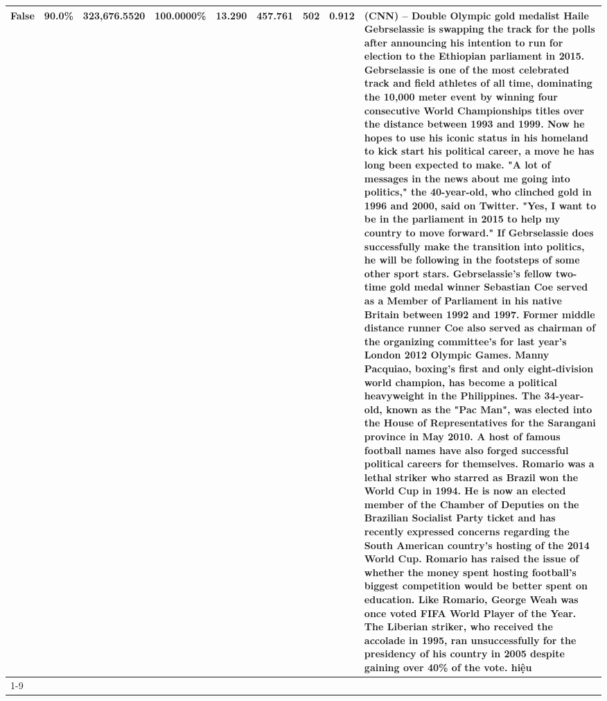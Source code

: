 \begin{table}[H]
{\begin{tabular}{lllrlllll}
False & 90.0\% & 323,676.5520 & \bfseries \color{red} 100.0000\% & 13.290 & 457.761 & 502 & 0.912 & (CNN) -- Double Olympic gold medalist Haile Gebrselassie is swapping the track for the polls after announcing his intention to run for election to the Ethiopian parliament in 2015. Gebrselassie is one of the most celebrated track and field athletes of all time, dominating the 10,000 meter event by winning four consecutive World Championships titles over the distance between 1993 and 1999. Now he hopes to use his iconic status in his homeland to kick start his political career, a move he has long been expected to make. "A lot of messages in the news about me going into politics," the 40-year-old, who clinched gold in 1996 and 2000, said on Twitter. "Yes, I want to be in the parliament in 2015 to help my country to move forward." If Gebrselassie does successfully make the transition into politics, he will be following in the footsteps of some other sport stars. Gebrselassie's fellow two-time gold medal winner Sebastian Coe served as a Member of Parliament in his native Britain between 1992 and 1997. Former middle distance runner Coe also served as chairman of the organizing committee's for last year's London 2012 Olympic Games. Manny Pacquiao, boxing's first and only eight-division world champion, has become a political heavyweight in the Philippines. The 34-year-old, known as the "Pac Man", was elected into the House of Representatives for the Sarangani province in May 2010. A host of famous football names have also forged successful political careers for themselves. Romario was a lethal striker who starred as Brazil won the World Cup in 1994. He is now an elected member of the Chamber of Deputies on the Brazilian Socialist Party ticket and has recently expressed concerns regarding the South American country's hosting of the 2014 World Cup. Romario has raised the issue of whether the money spent hosting football's biggest competition would be better spent on education. Like Romario, George Weah was once voted FIFA World Player of the Year. The Liberian striker, who received the accolade in 1995, ran unsuccessfully for the presidency of his country in 2005 despite gaining over 40\% of the vote. hiệu \\
\cline{1-9}

\end{tabular}}
\end{table}
